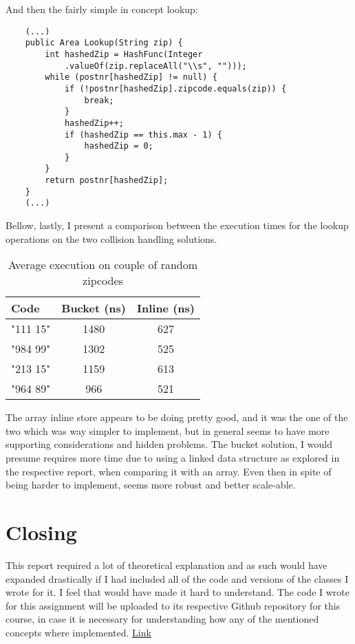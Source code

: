\documentclass[a4paper,11pt]{article}
\begin{document}
And then the fairly simple in concept lookup:

\begin{verbatim}
    (...)
    public Area Lookup(String zip) {
        int hashedZip = HashFunc(Integer
            .valueOf(zip.replaceAll("\\s", "")));
        while (postnr[hashedZip] != null) {
            if (!postnr[hashedZip].zipcode.equals(zip)) {
                break;
            }
            hashedZip++;
            if (hashedZip == this.max - 1) {
                hashedZip = 0;
            }
        }
        return postnr[hashedZip];
    }
    (...)
\end{verbatim}

Bellow, lastly, I present a comparison between the execution times for the lookup operations on the two collision handling solutions.
\def\arraystretch{1}
\begin{table}[H]
\begin{center}
\begin{tabular}{l|c|c}
\textbf{Code} & \textbf{Bucket (ns)} & \textbf{Inline (ns)}\\
\hline
   "111 15"     &  1480 &     627 \\
   "984 99"      &  1302 &    525 \\
   "213 15"     &  1159 &    613 \\
   "964 89"      &  966 &    521 \\
\end{tabular}
\caption{Average execution on couple of random zipcodes}
\label{tab:table1}
\end{center}
\end{table}

The array inline store appears to be doing pretty good, and it was the one of the two which was way simpler to implement, but in general seems to have more supporting considerations and hidden problems. The bucket solution, I would presume requires more time due to using a linked data structure as explored in the respective report, when comparing it with an array. Even then in spite of being harder to implement, seems more robust and better scale-able.

\section*{Closing}
This report required a lot of theoretical explanation and as such would have expanded drastically if I had included all of the code and versions of the classes I wrote for it. I feel that would have made it hard to understand. The code I wrote for this assignment will be uploaded to its respective Github repository for this course, in case it is necessary for understanding how any of the mentioned concepts where implemented. \href{https://github.com/kexana/Algorithms-and-Data-Structures-ID1021}{Link}
\end{document}
